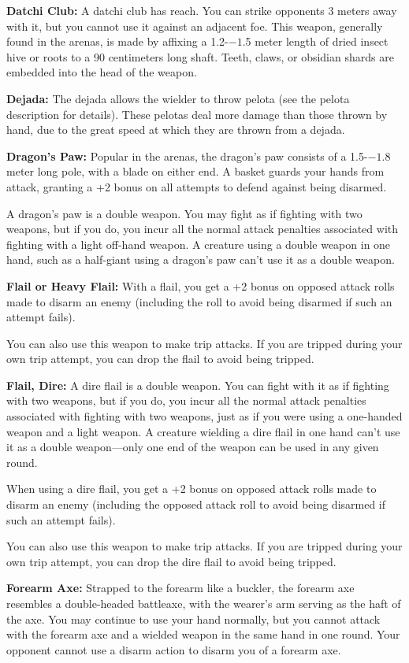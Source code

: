 \textbf{Datchi Club:} A datchi club has reach. You can strike opponents 3 meters away with it, but you cannot use it against an adjacent foe. This weapon, generally found in the arenas, is made by affixing a 1.2-$-1$.5 meter length of dried insect hive or roots to a 90 centimeters long shaft. Teeth, claws, or obsidian shards are embedded into the head of the weapon.

\textbf{Dejada:} The dejada allows the wielder to throw pelota (see the pelota description for details). These pelotas deal more damage than those thrown by hand, due to the great speed at which they are thrown from a dejada.

\textbf{Dragon's Paw:} Popular in the arenas, the dragon's paw consists of a 1.5-$-1$.8 meter long pole, with a blade on either end. A basket guards your hands from attack, granting a +2 bonus on all attempts to defend against being disarmed.

A dragon's paw is a double weapon. You may fight as if fighting with two weapons, but if you do, you incur all the normal attack penalties associated with fighting with a light off-hand weapon. A creature using a double weapon in one hand, such as a half-giant using a dragon's paw can't use it as a double weapon.

\textbf{Flail or Heavy Flail:} With a flail, you get a +2 bonus on opposed attack rolls made to disarm an enemy (including the roll to avoid being disarmed if such an attempt fails).

You can also use this weapon to make trip attacks. If you are tripped during your own trip attempt, you can drop the flail to avoid being tripped. 

\textbf{Flail, Dire:} A dire flail is a double weapon. You can fight with it as if fighting with two weapons, but if you do, you incur all the normal attack penalties associated with fighting with two weapons, just as if you were using a one-handed weapon and a light weapon. A creature wielding a dire flail in one hand can't use it as a double weapon---only one end of the weapon can be used in any given round.

When using a dire flail, you get a +2 bonus on opposed attack rolls made to disarm an enemy (including the opposed attack roll to avoid being disarmed if such an attempt fails).

You can also use this weapon to make trip attacks. If you are tripped during your own trip attempt, you can drop the dire flail to avoid being tripped. 

\textbf{Forearm Axe:} Strapped to the forearm like a buckler, the forearm axe resembles a double-headed battleaxe, with the wearer's arm serving as the haft of the axe. You may continue to use your hand normally, but you cannot attack with the forearm axe and a wielded weapon in the same hand in one round. Your opponent cannot use a disarm action to disarm you of a forearm axe.

